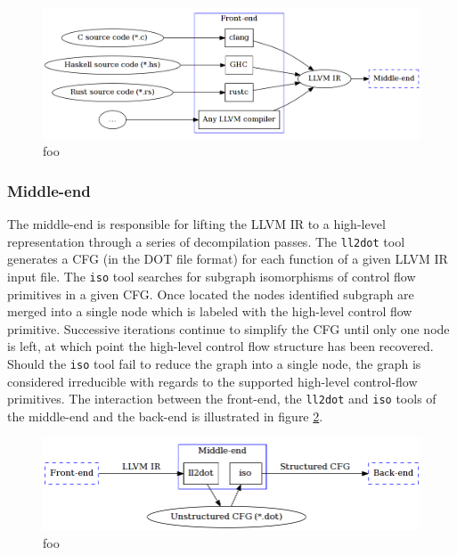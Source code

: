 \documentclass[12pt, a4paper]{article}
\begin{document}
\begin{figure}[htbp]
	\begin{center}
		\includegraphics[width=\textwidth]{inc/front-end_source.png}
		\caption{foo}
		\label{source_to_llvm}
	\end{center}
\end{figure}

\subsubsection{Middle-end}



The middle-end is responsible for lifting the LLVM IR to a high-level representation through a series of decompilation passes. The \texttt{ll2dot} tool generates a CFG (in the DOT file format) for each function of a given LLVM IR input file. The \texttt{iso} tool searches for subgraph isomorphisms of control flow primitives in a given CFG. Once located the nodes identified subgraph are merged into a single node which is labeled with the high-level control flow primitive. Successive iterations continue to simplify the CFG until only one node is left, at which point the high-level control flow structure has been recovered. Should the \texttt{iso} tool fail to reduce the graph into a single node, the graph is considered irreducible with regards to the supported high-level control-flow primitives. The interaction between the front-end, the \texttt{ll2dot} and \texttt{iso} tools of the middle-end and the back-end is illustrated in figure \ref{middle_end}.

\begin{figure}[htbp]
	\begin{center}
		\includegraphics[width=\textwidth]{inc/middle-end.png}
		\caption{foo}
		\label{middle_end}
	\end{center}
\end{figure}
\end{document}
